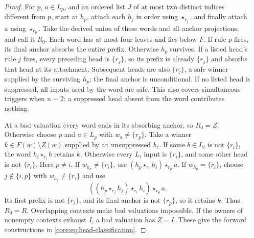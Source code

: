 \begin{proof}
For $p$, $a\in L_p$, and an ordered list $J$ of at most two distinct
indices different from $p$, start at $h_p$, attach each $h_j$ in order
using $\star_{r_j}$, and finally attach $a$ using $\star_{r_p}$.
Take the derived union of these words and all anchor projections,
and call it $R_0$. Each word has at most four leaves and lies below $F$.
If rule $p$ fires, its final anchor absorbs the entire prefix.
Otherwise $h_p$ survives. If a listed head's rule $j$ fires, every
preceding head is $\{r_j\}$, so its prefix is already $\{r_j\}$ and
absorbs that head at its attachment. Subsequent heads are also
$\{r_j\}$, a safe winner supplied by the surviving $h_p$; the final
anchor is unconditional. If no listed head is suppressed, all inputs
used by the word are safe. This also covers simultaneous triggers when
$n=2$; a suppressed head absent from the word contributes nothing.

At a bad valuation every word ends in its absorbing anchor, so $R_0=Z$.
Otherwise choose $p$ and $a\in L_p$ with $w_a\ne\{r_p\}$. Take a winner
$k\in F(w)\setminus Z(w)$ supplied by an unsuppressed $h_i$.
If some $b\in L_i$ is not $\{r_i\}$, the word $h_i\star_{r_i}b$
retains $k$. Otherwise every $L_i$ input is $\{r_i\}$, and some
other head is not $\{r_i\}$. Here $p\ne i$. If $w_{h_p}\ne\{r_i\}$,
use $(h_p\star_{r_i}h_i)\star_{r_p}a$. If $w_{h_p}=\{r_i\}$, choose
$j\notin\{i,p\}$ with $w_{h_j}\ne\{r_i\}$ and use
\[
 ((h_p\star_{r_j}h_j)\star_{r_i}h_i)\star_{r_p}a.
\]
Its first prefix is not $\{r_i\}$, and its final anchor is not
$\{r_p\}$, so it retains $k$. Thus $R_0=R$.
Overlapping contexts make bad valuations impossible. If the owners of
nonempty contexts exhaust $I$, a bad valuation has $Z=I$. These give
the forward constructions in \eqref{core:eq:head-classification}.


\end{proof}
